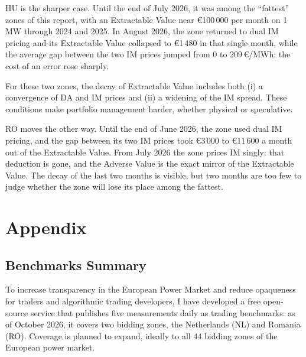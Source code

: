 \documentclass[11pt,a4paper]{article}
\begin{document}
HU is the sharper case. Until the end of July 2026, it was among the ``fattest'' zones of this report, with an Extractable Value near \euro100\,000 per month on 1\,MW through 2024 and 2025. In August 2026, the zone returned to dual IM pricing and its Extractable Value collapsed to \euro1\,480 in that single month, while the average gap between the two IM prices jumped from 0 to 209\,\euro/MWh: the cost of an error rose sharply.

For these two zones, the decay of Extractable Value includes both (i) a convergence of DA and IM prices and (ii) a widening of the IM spread. These conditions make portfolio management harder, whether physical or speculative.

RO moves the other way. Until the end of June 2026, the zone used dual IM pricing, and the gap between its two IM prices took \euro3\,000 to \euro11\,600 a month out of the Extractable Value. From July 2026 the zone prices IM singly: that deduction is gone, and the Adverse Value is the exact mirror of the Extractable Value. The decay of the last two months is visible, but two months are too few to judge whether the zone will lose its place among the fattest.

\section{Appendix}

\subsection{Benchmarks Summary}

To increase transparency in the European Power Market and reduce opaqueness for traders and algorithmic trading developers, I have developed a free open-source service that publishes five measurements daily as trading benchmarks: as of October 2026, it covers two bidding zones, the Netherlands (NL) and Romania (RO). Coverage is planned to expand, ideally to all 44 bidding zones of the European power market.
\end{document}
